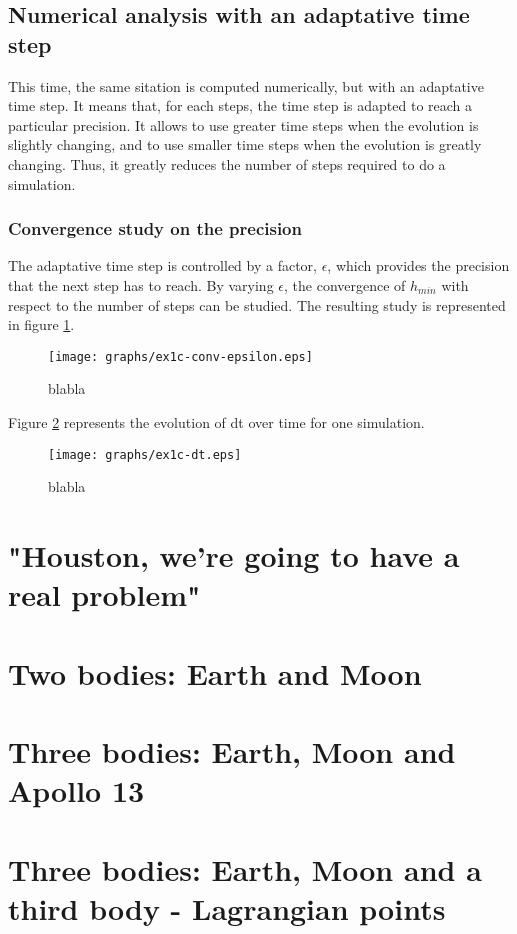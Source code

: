 \documentclass[a4paper,12pt,twoside]{article}
\begin{document}

\subsection{Numerical analysis with an adaptative time step}
This time, the same sitation is computed numerically, but with an adaptative time step.
It means that, for each steps, the time step is adapted to reach a particular precision.
It allows to use greater time steps when the evolution is slightly changing, and to use smaller time steps when the evolution is greatly changing.
Thus, it greatly reduces the number of steps required to do a simulation.

\subsubsection{Convergence study on the precision}
The adaptative time step is controlled by a factor, $\epsilon$, which provides the precision that the next step has to reach.
By varying $\epsilon$, the convergence of $h_{min}$ with respect to the number of steps can be studied.
The resulting study is represented in figure \ref{fig:1c-conv-epsilon}.

\begin{figure}[h]
  \centering
  \texttt{[image: graphs/ex1c-conv-epsilon.eps]}
  \caption{blabla}
  \label{fig:1c-conv-epsilon}
\end{figure}


Figure \ref{fig:1c-dt} represents the evolution of dt over time for one simulation.

\begin{figure}[h]
  \centering
  \texttt{[image: graphs/ex1c-dt.eps]}
  \caption{blabla}
  \label{fig:1c-dt}
\end{figure}


\section{"Houston, we're going to have a real problem"}

\section{Two bodies: Earth and Moon}

\section{Three bodies: Earth, Moon and Apollo 13}

\section{Three bodies: Earth, Moon and a third body - Lagrangian points}
\end{document}
